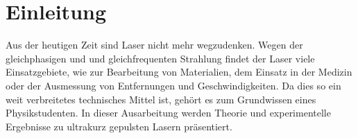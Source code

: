 \section{Einleitung}

Aus der heutigen Zeit sind Laser nicht mehr wegzudenken.
Wegen der gleichphasigen und und gleichfrequenten Strahlung findet der Laser
viele Einsatzgebiete, wie zur Bearbeitung von Materialien, dem Einsatz in der Medizin oder
der Ausmessung von Entfernungen und Geschwindigkeiten.
Da dies so ein weit verbreitetes technisches Mittel ist, gehört es
zum Grundwissen eines Physikstudenten.
In dieser Ausarbeitung werden Theorie und experimentelle Ergebnisse zu
ultrakurz gepulsten Lasern präsentiert.

